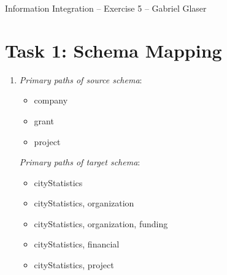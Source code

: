 \documentclass{scrartcl}
\begin{document}
	\begin{center}
		\LARGE
		Information Integration -- Exercise 5 -- Gabriel Glaser
	\end{center}
	
	\section*{Task 1: Schema Mapping}
	\begin{enumerate}
		\item \textit{Primary paths of source schema}:
		\begin{itemize}
			\item company
			\item grant
			\item project
		\end{itemize}
		
		\textit{Primary paths of target schema}:
		\begin{itemize}
			\item cityStatistics
			\item cityStatistics, organization
			\item cityStatistics, organization, funding
			\item cityStatistics, financial
			\item cityStatistics, project
		\end{itemize}
		

\end{enumerate}
\end{document}
